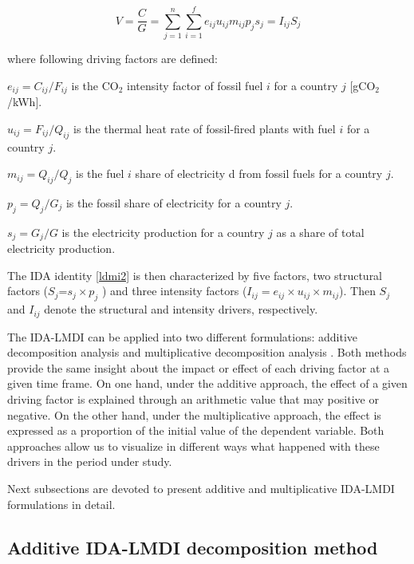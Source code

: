 \documentclass[energies,article,accept,moreauthors,12pt,a4paper]{mdpi} %
\begin{document}
 \begin{equation}\label{ldmi2}
  V=\frac{C}{G}=\sum^n_{j=1}\sum^f_{i=1} {e_{ij}}  {u_{ij}}  {m_{ij}} {p_{j}} {s_{j}} =
  {I_{ij}}{S_{j}}
\end{equation}

\noindent where following driving factors are defined:

\noindent $e_{ij}=C_{ij}/F_{ij}$ is the CO$_2$ intensity factor of fossil fuel $i$ for a country $j$ [gCO$_2$/kWh].

\noindent $u_{ij}=F_{ij}/Q_{ij}$ is the thermal heat rate of fossil-fired plants with fuel $i$ for a country $j$.

\noindent $m_{ij}=Q_{ij}/Q_{j}$ is the fuel $i$ share of electricity d from fossil  fuels for a country $j$.

\noindent $p_{j}=Q_{j}/G_{j}$ is the fossil share of electricity for a country $j$.

\noindent $s_{j}=G_{j}/G$ is the electricity production for a country $j$ as a share of
total electricity production.

The IDA identity \ref{ldmi2} is then characterized by five factors, two structural factors (${S_{j}}$=$s_{j} \times p_{j}$ ) and three intensity factors
(${I_{ij}}= e_{ij} \times u_{ij} \times m_{ij}$). Then ${S_{j}}$ and ${I_{ij}}$ denote the structural and intensity drivers, respectively.



The IDA-LMDI can be applied into two different formulations: additive decomposition analysis and
multiplicative decomposition analysis \cite{zhang2000}. Both methods provide the same insight about the impact or effect of each
driving factor at a given time frame. On one hand, under the additive approach, the effect of a given driving factor is explained through an arithmetic value that may positive or negative. On the other hand, under the multiplicative approach, the  effect is expressed as a proportion of the initial value of the dependent variable. Both approaches allow us to visualize in different ways what happened with these drivers in the period under study.






Next subsections are devoted to present additive and multiplicative IDA-LMDI formulations in detail. 

\subsection{Additive IDA-LMDI decomposition method}\label{amm1}
\end{document}
